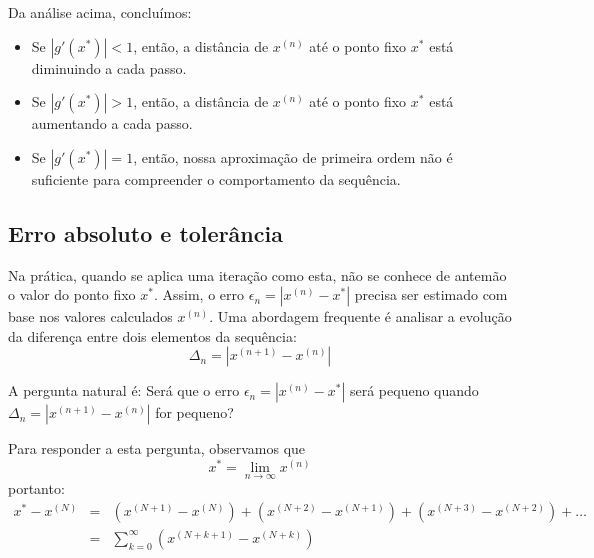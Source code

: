 \begin{obs} Da análise acima, concluímos:
\begin{itemize}
\item Se $|g'(x^*)|<1$, então, a distância de $x^{(n)}$ até o ponto fixo $x^*$ está diminuindo a cada passo.
\item Se $|g'(x^*)|>1$, então, a distância de $x^{(n)}$ até o ponto fixo $x^*$ está aumentando a cada passo.
\item Se $|g'(x^*)|=1$, então, nossa aproximação de primeira ordem não é suficiente para compreender o comportamento da sequência.
\end{itemize}
\end{obs}

\subsection{Erro absoluto e tolerância}

Na prática, quando se aplica uma iteração como esta, não se conhece de antemão o valor do ponto fixo $x^*$. Assim, o erro $\epsilon_n=\left|x^{(n)}-x^*\right|$ precisa ser estimado com base nos valores calculados $x^{(n)}$. Uma abordagem frequente é analisar a evolução da diferença entre dois elementos da sequência:
\begin{equation} \Delta_n=\left|x^{(n+1)}-x^{(n)}\right| \end{equation}

A pergunta natural é: Será que o erro $\epsilon_n=\left|x^{(n)}-x^*\right|$ será pequeno quando  $\Delta_n=\left|x^{(n+1)}-x^{(n)}\right|$ for pequeno?

Para responder a esta pergunta, observamos que
\begin{equation} x^*=\lim_{n\to \infty }x^{(n)} \end{equation}
portanto:
\begin{eqnarray}
x^*-x^{(N)}&=&  \left(x^{(N+1)}-x^{(N)}\right)+\left(x^{(N+2)}-x^{(N+1)}\right)+\left(x^{(N+3)}-x^{(N+2)}\right)+\ldots\\
&=&\sum_{k=0}^\infty \left(x^{(N+k+1)}-x^{(N+k)}\right)
\end{eqnarray}

